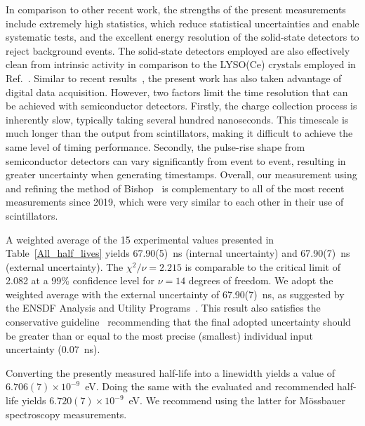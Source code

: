 \documentclass[aps,UTF8,prc,twocolumn,preprintnumbers,amsmath,amssymb,floatfix]{revtex4-2}
\begin{document}
In comparison to other recent work, the strengths of the present measurements include extremely high statistics, which reduce statistical uncertainties and enable systematic tests, and the excellent energy resolution of the solid-state detectors to reject background events. The solid-state detectors employed are also effectively clean from intrinsic activity in comparison to the LYSO(Ce) crystals employed in Ref.~\cite{Santos_NPA2023}. Similar to recent results~\cite{Vretenar_AJP2019,Takacs_ARI2021,Dutsov_ARI2021,Santos_NPA2023}, the present work has also taken advantage of digital data acquisition. However, two factors limit the time resolution that can be achieved with semiconductor detectors. Firstly, the charge collection process is inherently slow, typically taking several hundred nanoseconds. This timescale is much longer than the output from scintillators, making it difficult to achieve the same level of timing performance. Secondly, the pulse-rise shape from semiconductor detectors can vary significantly from event to event, resulting in greater uncertainty when generating timestamps. Overall, our measurement using and refining the method of Bishop~\cite{Bishop_NIM1974} is complementary to all of the most recent measurements since 2019, which were very similar to each other in their use of scintillators. 

A weighted average of the 15 experimental values presented in Table~\ref{All_half_lives} yields 67.90(5)~ns (internal uncertainty) and 67.90(7)~ns (external uncertainty). The $\chi^{2}/\nu=2.215$ is comparable to the critical limit of 2.082 at a 99\% confidence level for $\nu=14$ degrees of freedom. We adopt the weighted average with the external uncertainty of 67.90(7)~ns, as suggested by the ENSDF Analysis and Utility Programs~\cite{ENSDF_Codes}. This result also satisfies the conservative guideline~\cite{Ricard-McCutchan_NSDD2015} recommending that the final adopted uncertainty should be greater than or equal to the most precise (smallest) individual input uncertainty ($0.07$~ns).

Converting the presently measured half-life into a linewidth yields a value of $6.706(7)\times10^{-9}$~eV. Doing the same with the evaluated and recommended half-life yields $6.720(7)\times10^{-9}$~eV. We recommend using the latter for M\"{o}ssbauer spectroscopy measurements. 
\end{document}
